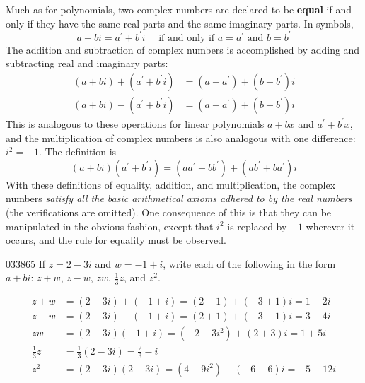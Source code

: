 Much as for polynomials, two complex numbers are declared to be \textbf{equal} if and only if they have the same real parts and the same imaginary parts. In symbols,
\begin{equation*}
a+bi = a^{\prime} + b^{\prime} i \quad \mbox{ if and only if } a = a^{\prime} \mbox{ and } b = b^{\prime} 
\end{equation*}
The addition and subtraction of complex numbers is accomplished by adding and subtracting real and imaginary parts:
\begin{align*}
(a+bi) + (a^{\prime} + b^{\prime}i) & = (a + a^{\prime}) + (b + b^{\prime})i\\ 
(a+bi) - (a^{\prime} + b^{\prime}i) & = (a - a^{\prime}) + (b - b^{\prime})i
\end{align*}
This is analogous to these operations for linear polynomials $a + bx$ and $a^{\prime} + b^{\prime}x$, and the multiplication of complex numbers is also analogous with one difference: $i^{2} = -1$. The definition is
\begin{equation*}
(a+bi)(a^{\prime} + b^{\prime}i) = (a a^{\prime} - b b^{\prime}) + (a b^{\prime} + b a^{\prime})i 
\end{equation*}
With these definitions of equality, addition, and multiplication, the complex numbers \textit{satisfy all the basic arithmetical axioms adhered to by the real numbers} (the verifications are omitted). One consequence of this is that they can be manipulated in the obvious fashion, except that $i^{2}$ is replaced by $-1$ wherever it occurs, and the rule for equality must be observed.


\begin{example}{}{033865}
If $z = 2 - 3i$ and $w = -1 + i$, write each of the following in the form $a + bi$: $z + w$, $z - w$, $zw$, $\frac{1}{3}z$, and $z^{2}$.


\begin{solution}
\begin{align*}
z+w & = (2-3i) + (-1+i) = (2-1) + (-3+1)i = 1-2i \\
z-w & = (2-3i) - (-1+i) = (2+1) + (-3-1)i = 3-4i \\ 
zw &= (2-3i)(-1+i) = (-2-3i^2) + (2+3)i = 1+5i \\
\frac{1}{3}z &= \frac{1}{3}(2-3i) = \frac{2}{3}-i \\
z^2 &=(2-3i)(2-3i) = (4+9i^2) + (-6-6)i = -5-12i 
\end{align*}
\end{solution}
\end{example}

